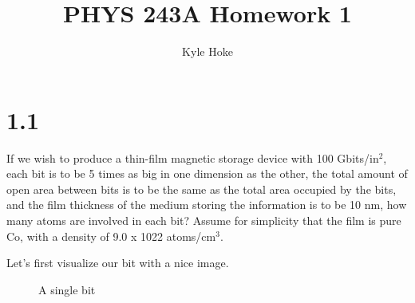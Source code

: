 \documentclass[12pt]{article}
\title{\LARGE PHYS 243A Homework 1}
\author{Kyle Hoke}
\makeatletter
\renewcommand{\maketitle} %
{ \begingroup \vskip 10pt \begin{center} \large {\bf \@title}
	\vskip 10pt \large \@author \hskip 20pt \@date \end{center}
  \vskip 10pt \endgroup \setcounter{footnote}{0} }
\renewcommand{\=}[1]{\stackrel{#1}{=}} %
\theoremstyle{definition}
\theoremstyle{remark}
\makeatother
\begin{document}
\maketitle
\thispagestyle{empty}






\section*{1.1}

\begin{bclogo}[logo=\bcquestion , barre=none]
\newline
If we wish to produce a thin-film magnetic storage device with 100 Gbits/in$^2$, each bit is to be 5
times as big in one dimension as the other, the total amount of open area between bits is to be the
same as the total area occupied by the bits, and the film thickness of the medium storing the
information is to be 10 nm, how many atoms are involved in each bit? Assume for simplicity that the
film is pure Co, with a density of 9.0 x 1022 atoms/cm$^3$.
\end{bclogo}
\vspace{1cm}


Let's first visualize our bit with a nice image.

\begin{figure}[H]
 \centering
 \caption{A single bit}
 \label{bit}
\end{figure}
\end{document}
